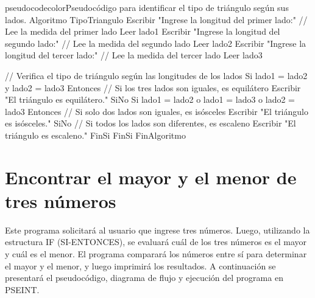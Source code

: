 \documentclass[
	spanish, %
	letterpaper, oneside
]{article}
\begin{document}
\begin{sourcecode}{pseudocodecolor}{Pseudocódigo para identificar el tipo de triángulo según sus lados.}
Algoritmo TipoTriangulo
    Escribir "Ingrese la longitud del primer lado:"
    // Lee la medida del primer lado
    Leer lado1
    Escribir "Ingrese la longitud del segundo lado:"
    // Lee la medida del segundo lado
    Leer lado2
    Escribir "Ingrese la longitud del tercer lado:"
    // Lee la medida del tercer lado
    Leer lado3
    
    // Verifica el tipo de triángulo según las longitudes de los lados
    Si lado1 = lado2 y lado2 = lado3 Entonces
        // Si los tres lados son iguales, es equilátero
        Escribir "El triángulo es equilátero."
    SiNo Si lado1 = lado2 o lado1 = lado3 o lado2 = lado3 Entonces
			// Si solo dos lados son iguales, es isósceles
			Escribir "El triángulo es isósceles."
		SiNo
			// Si todos los lados son diferentes, es escaleno
			Escribir "El triángulo es escaleno."
		FinSi
	FinSi
FinAlgoritmo
\end{sourcecode}



\section{Encontrar el mayor y el menor de tres números}

Este programa solicitará al usuario que ingrese tres números. Luego, utilizando la estructura IF (SI-ENTONCES), se evaluará cuál de los tres números es el mayor y cuál es el menor. El programa comparará los números entre sí para determinar el mayor y el menor, y luego imprimirá los resultados. A continuación se presentará el pseudocódigo, diagrama de flujo y ejecución del programa en PSEINT.
\end{document}
